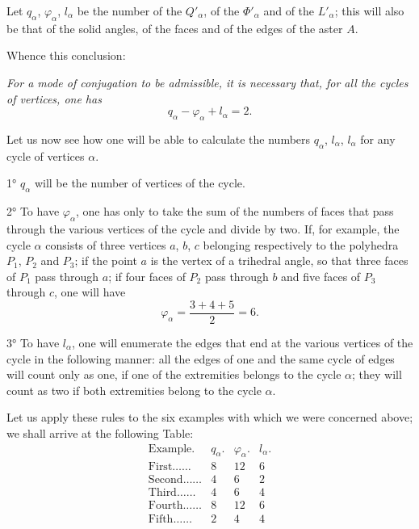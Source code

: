 \documentclass{article}
\begin{document}
Let $q_{\alpha}$, $\varphi_{\alpha}$, $l_{\alpha}$ be the number of the $Q'_{\alpha}$, of the $\Phi'_{\alpha}$ and of the $L'_{\alpha}$; this will also be that of the solid angles, of the faces and of the edges of the aster $A$.

Whence this conclusion:

\emph{For a mode of conjugation to be admissible, it is necessary that, for all the cycles of vertices, one has}
\[ q_{\alpha} - \varphi_{\alpha} + l_{\alpha} = 2. \]

Let us now see how one will be able to calculate the numbers $q_{\alpha}$, $l_{\alpha}$, $l_{\alpha}$ for any cycle of vertices $\alpha$.

1° $q_{\alpha}$ will be the number of vertices of the cycle.

2° To have $\varphi_{\alpha}$, one has only to take the sum of the numbers of faces that pass through the various vertices of the cycle and divide by two. If,
for example, the cycle $\alpha$ consists of three vertices $a$, $b$, $c$ belonging respectively to the polyhedra $P_{1}$, $P_{2}$ and $P_{3}$; if the point $a$ is the vertex of a trihedral angle, so that three faces of $P_{1}$ pass through $a$; if four faces of $P_{2}$ pass through $b$ and five faces of $P_{3}$ through $c$, one will have
\[ \varphi_{\alpha} = \frac{3 + 4 + 5}{2} = 6. \]

3° To have $l_{\alpha}$, one will enumerate the edges that end at the various vertices of the cycle in the following manner: all the edges of one and the same cycle of edges will count only as one, if one of the extremities belongs to the cycle $\alpha$; they will count as two if both extremities belong to the cycle $\alpha$.

Let us apply these rules to the six examples with which we were concerned above; we shall arrive at the following Table:
\[ \begin{matrix} \text{Example.} & q_{\alpha}. & \varphi_{\alpha}. & l_{\alpha}. \\[1ex] \text{First}\ldots\ldots & 8 & 12 & 6 \\[1ex] \text{Second}\ldots\ldots & 4 & 6 & 2 \\[1ex] \text{Third}\ldots\ldots & 4 & 6 & 4 \\[1ex] \text{Fourth}\ldots\ldots & 8 & 12 & 6 \\[1ex] \text{Fifth}\ldots\ldots & 2 & 4 & 4 \end{matrix} \]
\end{document}
